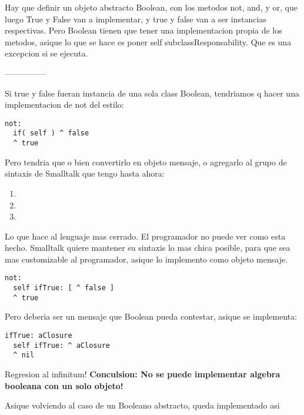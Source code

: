 
Hay que definir un objeto abstracto Boolean, con los metodos not, and, y or, que luego True y False van a implementar, y true y false van a ser instancias respectivas. Pero Boolean tienen que tener una implementacion propia de los metodos, asique lo que se hace es poner self subclassResponsability. Que es una excepcion si se ejecuta. 

---------------

Si true y false fueran instancia de una sola class Boolean, tendriamos q hacer una implementacion de not del estilo: 

\begin{verbatim}
not: 
  if( self ) ^ false
  ^ true
\end{verbatim}

Pero  tendria que o bien convertirlo en objeto mensaje, o agregarlo al grupo de sintaxis de Smalltalk que tengo hasta ahora: 
\begin{enumerate}
\item {}
\item {}
\item {}
\end{enumerate}

Lo que hace al lenguaje mas cerrado. El programador no puede ver como esta hecho. 
Smalltalk quiere mantener su sintaxis lo mas chica posible, para que sea mas customizable al programador, asique lo implemento como objeto mensaje. 

\begin{verbatim}
not: 
  self ifTrue: [ ^ false ]
  ^ true
\end{verbatim}

Pero  deberia ser un mensaje que Boolean pueda contestar, asique se implementa: 

\begin{verbatim}
ifTrue: aClosure
  self ifTrue: ^ aClosure
  ^ nil
\end{verbatim}

Regresion al infinitum! 
\textbf{Conculsion: No se puede implementar algebra booleana con un solo objeto!}

Asique volviendo al caso de un Booleano abstracto,  queda implementado asi 


